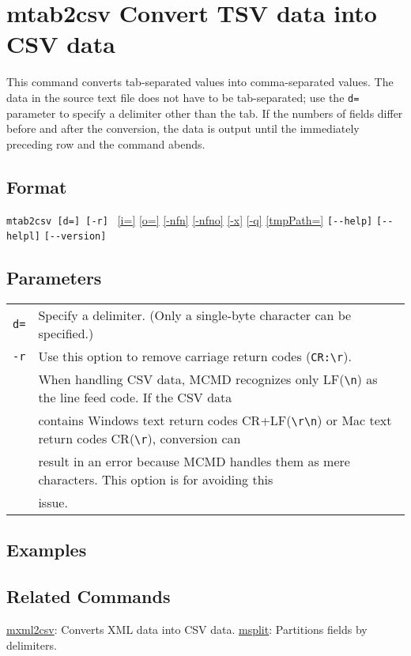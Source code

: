 
%

\section{mtab2csv Convert TSV data into CSV data\label{sect:mtab2csv}}
This command converts tab-separated values into comma-separated values. The data in the source text file does not have to be tab-separated; use the \verb|d=| parameter to specify a delimiter other than the tab. If the numbers of fields differ before and after the conversion, the data is output until the immediately preceding row and the command abends.

\subsection*{Format}
\verb|mtab2csv [d=] [-r] |
\hyperref[sect:option_i]{[i=]}
\hyperref[sect:option_o]{[o=]}
\hyperref[sect:option_nfn]{[-nfn]} 
\hyperref[sect:option_nfno]{[-nfno]}  
\hyperref[sect:option_x]{[-x]}
\hyperref[sect:option_q]{[-q]}
\hyperref[sect:option_option_tmppath]{[tmpPath=]}
\verb|[--help]|
\verb|[--helpl]|
\verb|[--version]|\\

\subsection*{Parameters}
\begin{table}[htbp]
{\small
\begin{tabular}{ll}
\verb|d=|    & Specify a delimiter. (Only a single-byte character can be specified.)\\
\verb|-r|    & Use this option to remove carriage return codes (\verb|CR:\r|).\\
             & When handling CSV data, MCMD recognizes only LF(\verb|\n|) as the line feed code. If the CSV data\\
             & contains Windows text return codes CR+LF(\verb|\r\n|) or Mac text return codes CR(\verb|\r|), conversion can\\
             & result in an error because MCMD handles them as mere characters. This option is for avoiding this\\
             & issue.\\
\end{tabular} 
}
\end{table} 

\subsection*{Examples}

\subsection*{Related Commands}
\hyperref[sect:mxml2csv]{mxml2csv}: Converts XML data into CSV data.
\hyperref[sect:msplit]{msplit}: Partitions fields by delimiters.
%

